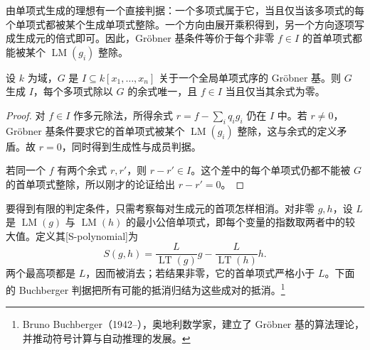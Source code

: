 由单项式生成的理想有一个直接判据：一个多项式属于它，当且仅当该多项式的每个单项式都被某个生成单项式整除。一个方向由展开乘积得到，另一个方向逐项写成生成元的倍式即可。因此，Gröbner 基条件等价于每个非零 \(f\in I\) 的首单项式都能被某个 \(\operatorname{LM}(g_i)\) 整除。

\begin{proposition}\label{g5:prop:groebner-remainder}
	设 \(k\) 为域，\(G\) 是 \(I\subseteq k[x_1,\ldots,x_n]\) 关于一个全局单项式序的 Gröbner 基。则 \(G\) 生成 \(I\)，每个多项式除以 \(G\) 的余式唯一，且 \(f\in I\) 当且仅当其余式为零。
\end{proposition}
\begin{proof}
	对 \(f\in I\) 作多元除法，所得余式 \(r=f-\sum_iq_ig_i\) 仍在 \(I\) 中。若 \(r\ne0\)，Gröbner 基条件要求它的首单项式被某个 \(\operatorname{LM}(g_i)\) 整除，这与余式的定义矛盾。故 \(r=0\)，同时得到生成性与成员判据。

	若同一个 \(f\) 有两个余式 \(r,r'\)，则 \(r-r'\in I\)。这个差中的每个单项式仍都不能被 \(G\) 的首单项式整除，所以刚才的论证给出 \(r-r'=0\)。
\end{proof}

要得到有限的判定条件，只需考察每对生成元的首项怎样相消。对非零 \(g,h\)，设 \(L\) 是 \(\operatorname{LM}(g)\) 与 \(\operatorname{LM}(h)\) 的最小公倍单项式，即每个变量的指数取两者中的较大值。定义其[S-polynomial]为
\[
	S(g,h)=\frac{L}{\operatorname{LT}(g)}g-\frac{L}{\operatorname{LT}(h)}h.
\]
两个最高项都是 \(L\)，因而被消去；若结果非零，它的首单项式严格小于 \(L\)。下面的 Buchberger 判据把所有可能的抵消归结为这些成对的抵消。\footnote{Bruno Buchberger（1942--），奥地利数学家，建立了 Gröbner 基的算法理论，并推动符号计算与自动推理的发展。}


